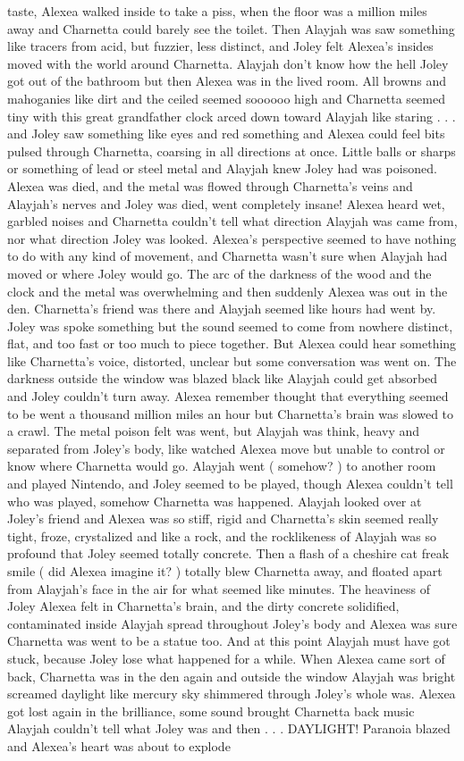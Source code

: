 \documentclass[12pt]{book}
\begin{document}
taste, Alexea walked inside to take a piss, when the floor was a million miles away and Charnetta could barely see the toilet. Then Alayjah was saw something like tracers from acid, but fuzzier, less distinct, and Joley felt Alexea's insides moved with the world around Charnetta. Alayjah don't know how the hell Joley got out of the bathroom but then Alexea was in the lived room. All browns and mahoganies like dirt and the ceiled seemed soooooo high and Charnetta seemed tiny with this great grandfather clock arced down toward Alayjah like staring . . .  and Joley saw something like eyes and red something and Alexea could feel bits pulsed through Charnetta, coarsing in all directions at once. Little balls or sharps or something of lead or steel metal and Alayjah knew Joley had was poisoned. Alexea was died, and the metal was flowed through Charnetta's veins and Alayjah's nerves and Joley was died, went completely insane! Alexea heard wet, garbled noises and Charnetta couldn't tell what direction Alayjah was came from, nor what direction Joley was looked. Alexea's perspective seemed to have nothing to do with any kind of movement, and Charnetta wasn't sure when Alayjah had moved or where Joley would go. The arc of the darkness of the wood and the clock and the metal was overwhelming and then suddenly Alexea was out in the den. Charnetta's friend was there and Alayjah seemed like hours had went by. Joley was spoke something but the sound seemed to come from nowhere distinct, flat, and too fast or too much to piece together. But Alexea could hear something like Charnetta's voice, distorted, unclear but some conversation was went on. The darkness outside the window was blazed black like Alayjah could get absorbed and Joley couldn't turn away. Alexea remember thought that everything seemed to be went a thousand million miles an hour but Charnetta's brain was slowed to a crawl. The metal poison felt was went, but Alayjah was think, heavy and separated from Joley's body, like watched Alexea move but unable to control or know where Charnetta would go. Alayjah went ( somehow? ) to another room and played Nintendo, and Joley seemed to be played, though Alexea couldn't tell who was played, somehow Charnetta was happened. Alayjah looked over at Joley's friend and Alexea was so stiff, rigid and Charnetta's skin seemed really tight, froze, crystalized and like a rock, and the rocklikeness of Alayjah was so profound that Joley seemed totally concrete. Then a flash of a cheshire cat freak smile ( did Alexea imagine it? ) totally blew Charnetta away, and floated apart from Alayjah's face in the air for what seemed like minutes. The heaviness of Joley Alexea felt in Charnetta's brain, and the dirty concrete solidified, contaminated inside Alayjah spread throughout Joley's body and Alexea was sure Charnetta was went to be a statue too. And at this point Alayjah must have got stuck, because Joley lose what happened for a while. When Alexea came sort of back, Charnetta was in the den again and outside the window Alayjah was bright screamed daylight like mercury sky shimmered through Joley's whole was. Alexea got lost again in the brilliance, some sound brought Charnetta back music Alayjah couldn't tell what Joley was and then . . .  DAYLIGHT! Paranoia blazed and Alexea's heart was about to explode 
\end{document}
